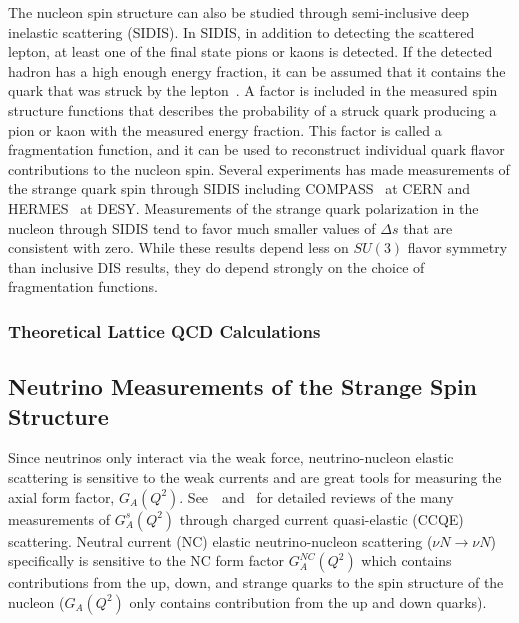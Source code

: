   The nucleon spin structure can also be studied through semi-inclusive deep
  inelastic scattering (SIDIS). In SIDIS, in addition to detecting the
  scattered lepton, at least one of the final state pions or kaons is detected.
  If the detected hadron has a high enough energy fraction, it can be assumed
  that it contains the quark that was struck by the lepton~\cite{Bass:2007zzb}.
  A factor is included in the measured spin structure functions that describes
  the probability of a struck quark producing a pion or kaon with the measured
  energy fraction. This factor is called a fragmentation function, and it can
  be used to reconstruct individual quark flavor contributions to the nucleon
  spin. Several experiments has made measurements of the strange quark spin
  through SIDIS including COMPASS~\cite{Alekseev:2009ac,Alekseev:2010ub} at
  CERN and HERMES~\cite{Airapetian:2003ct,Airapetian:2004zf,Airapetian:2008qf}
  at DESY.  Measurements of the strange quark polarization in the nucleon
  through SIDIS tend to favor much smaller values of $\Delta s$ that are
  consistent with zero. While these results depend less on $SU(3)$ flavor
  symmetry than inclusive DIS results, they do depend strongly on the choice of
  fragmentation functions.
  
  \subsubsection{Theoretical Lattice QCD Calculations}



\subsection{Neutrino Measurements of the Strange Spin Structure}
\label{sec:neutrinos}
  Since neutrinos only interact via the weak force, neutrino-nucleon elastic
  scattering is sensitive to the weak currents and are great tools for
  measuring the axial form factor, $G_A(Q^2)$.
  See~\cite{Lyubushkin:2008pe}~and~\cite{Formaggio:2013kya} for detailed
  reviews of the many measurements of $G_A^s(Q^2)$ through charged current
  quasi-elastic (CCQE) scattering. Neutral current (NC) elastic
  neutrino-nucleon scattering ($\nu N \rightarrow \nu N$) specifically is
  sensitive to the NC form factor $G_A^{NC}(Q^2)$ which contains
  contributions from the up, down, and strange quarks to the spin structure
  of the nucleon ($G_A(Q^2)$ only contains contribution from the up and down
  quarks).

